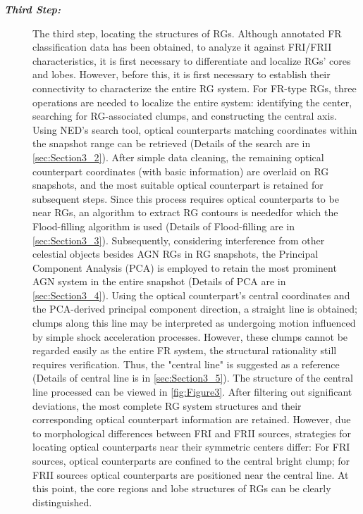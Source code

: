 \documentclass{aa}
\begin{document}
\begin{description}
    \item[\textbf{\textit{Third Step:}}]
    The third step, locating the structures of RGs. Although annotated FR classification data has been obtained, to analyze it against FRI/FRII characteristics, it is first necessary to differentiate and localize RGs’ cores and lobes. However, before this, it is first necessary to establish their connectivity to characterize the entire RG system. For FR-type RGs, three operations are needed to localize the entire system: identifying the center, searching for RG-associated clumps, and constructing the central axis. Using NED’s search tool, optical counterparts matching coordinates within the snapshot range can be retrieved (Details of the search are in \autoref{sec:Section3_2}). After simple data cleaning, the remaining optical counterpart coordinates (with basic information) are overlaid on RG snapshots, and the most suitable optical counterpart is retained for subsequent steps. Since this process requires optical counterparts to be near RGs, an algorithm to extract RG contours is needed\textemdash for which the Flood-filling algorithm is used (Details of Flood-filling are in \autoref{sec:Section3_3}). Subsequently, considering interference from other celestial objects besides AGN RGs in RG snapshots, the Principal Component Analysis (PCA) is employed to retain the most prominent AGN system in the entire snapshot (Details of PCA are in \autoref{sec:Section3_4}). Using the optical counterpart’s central coordinates and the PCA-derived principal component direction, a straight line is obtained; clumps along this line may be interpreted as undergoing motion influenced by simple shock acceleration processes. However, these clumps cannot be regarded easily as the entire FR system, the structural rationality still requires verification. Thus, the "central line" is suggested as a reference (Details of central line is in \autoref{sec:Section3_5}). The structure of the central line processed can be viewed in \autoref{fig:Figure3}. After filtering out significant deviations, the most complete RG system structures and their corresponding optical counterpart information are retained. However, due to morphological differences between FRI and FRII sources, strategies for locating optical counterparts near their symmetric centers differ: For FRI sources, optical counterparts are confined to the central bright clump; for FRII sources optical counterparts are positioned near the central line. At this point, the core regions and lobe structures of RGs can be clearly distinguished.



\end{description}
\end{document}
